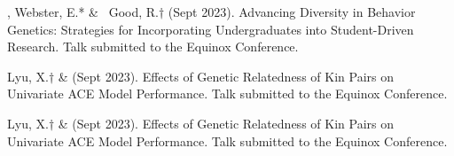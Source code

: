 

\item \meb, Webster, E.* \& \ Good, R.$\dagger$ (Sept 2023). Advancing Diversity in Behavior Genetics: Strategies for Incorporating Undergraduates into Student-Driven Research. Talk submitted to the Equinox Conference.

\item Lyu, X.$\dagger$ \& \meb (Sept 2023). Effects of Genetic Relatedness of Kin Pairs on Univariate ACE Model Performance. Talk submitted to the Equinox Conference.

\item Lyu, X.$\dagger$ \& \meb (Sept 2023). Effects of Genetic Relatedness of Kin Pairs on Univariate ACE Model Performance. Talk submitted to the Equinox Conference.



%
%

%

%

%

%
